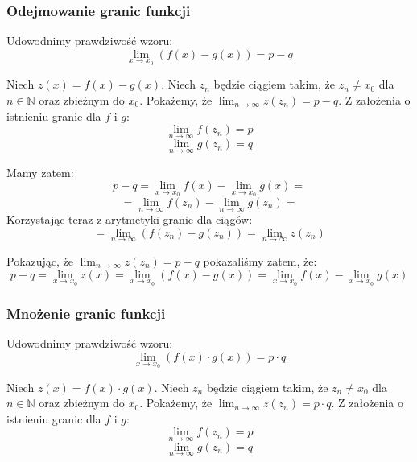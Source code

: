 \documentclass{article}
\begin{document}
\subsubsection{Odejmowanie granic funkcji}

Udowodnimy prawdziwość wzoru:
\begin{equation*}
    \lim_{x \to x_0}(f(x) - g(x)) = p - q
\end{equation*}

Niech \(z(x) = f(x) - g(x)\). Niech \(z_n\) będzie ciągiem takim, że \(z_n \neq x_0\) dla \(n \in \mathbb{N}\) oraz zbieżnym do \(x_0\).
Pokażemy, że \(\lim_{n \to \infty} z(z_n) = p - q\). Z założenia o istnieniu granic dla \(f\) i \(g\):
\begin{equation*}
    \lim_{n \to \infty} f(z_n) = p
\end{equation*}
\begin{equation*}
    \lim_{n \to \infty} g(z_n) = q
\end{equation*}

Mamy zatem:
\begin{equation*}
    p - q = \lim_{x \to x_0} f(x) - \lim_{x \to x_0} g(x) = 
\end{equation*}
\begin{equation*}
    = \lim_{n \to \infty} f(z_n) - \lim_{n \to \infty} g(z_n) =
\end{equation*}
Korzystając teraz z arytmetyki granic dla ciągów:
\begin{equation*}
    = \lim_{n \to \infty} (f(z_n) - g(z_n)) = \lim_{n \to \infty} z(z_n)
\end{equation*}

Pokazując, że \(\lim_{n \to \infty} z(z_n) = p - q\) pokazaliśmy zatem, że:
\begin{equation*}
    p - q = \lim_{x \to x_0} z(x) = \lim_{x \to x_0} (f(x) - g(x)) = \lim_{x \to x_0} f(x) - \lim_{x \to x_0} g(x)
\end{equation*}

\subsubsection{Mnożenie granic funkcji}

Udowodnimy prawdziwość wzoru: 
\begin{equation*}
    \lim_{x \to x_0}(f(x) \cdot g(x)) = p \cdot q
\end{equation*}

Niech \(z(x) = f(x) \cdot g(x)\). Niech \(z_n\) będzie ciągiem takim, że \(z_n \neq x_0\) dla \(n \in \mathbb{N}\) oraz zbieżnym do \(x_0\).
Pokażemy, że \(\lim_{n \to \infty} z(z_n) = p \cdot q\). Z założenia o istnieniu granic dla \(f\) i \(g\):
\begin{equation*}
    \lim_{n \to \infty} f(z_n) = p
\end{equation*}
\begin{equation*}
    \lim_{n \to \infty} g(z_n) = q
\end{equation*}
\end{document}
